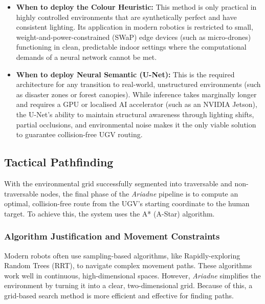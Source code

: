 \documentclass[12pt, a4paper]{article}
\begin{document}
\begin{itemize}
  \item \textbf{When to deploy the Colour Heuristic:} This method is only practical in highly controlled environments that are synthetically perfect and have consistent lighting. Its application in modern robotics is restricted to small, weight-and-power-constrained (SWaP) edge devices (such as micro-drones) functioning in clean, predictable indoor settings where the computational demands of a neural network cannot be met.
  
  \item \textbf{When to deploy Neural Semantic (U-Net):} This is the required architecture for any transition to real-world, unstructured environments (such as disaster zones or forest canopies). While inference takes marginally longer and requires a GPU or localised AI accelerator (such as an NVIDIA Jetson), the U-Net's ability to maintain structural awareness through lighting shifts, partial occlusions, and environmental noise makes it the only viable solution to guarantee collision-free UGV routing.
\end{itemize}

\vspace{0.5cm}

\subsection{Tactical Pathfinding}

\quad With the environmental grid successfully segmented into traversable and non-traversable nodes, the final phase of the \textit{Ariadne} pipeline is to compute an optimal, collision-free route from the UGV's starting coordinate to the human target. To achieve this, the system uses the A* (A-Star) algorithm.

\vspace{0.5cm}

\subsubsection{Algorithm Justification and Movement Constraints}

\quad Modern robots often use sampling-based algorithms, like Rapidly-exploring Random Trees (RRT), to navigate complex movement paths. These algorithms work well in continuous, high-dimensional spaces. However, \textit{Ariadne} simplifies the environment by turning it into a clear, two-dimensional grid. Because of this, a grid-based search method is more efficient and effective for finding paths.
\end{document}
